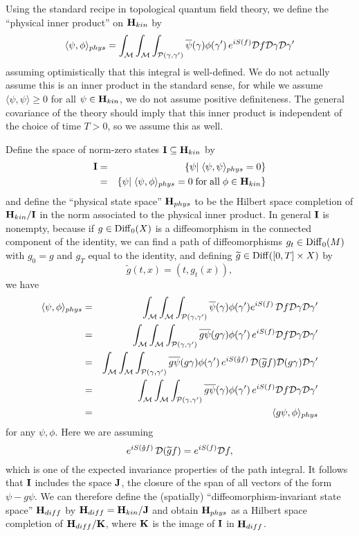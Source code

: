 \documentclass[12pt]{article}
\newcommand{\ban}{\begin{eqnarray*}}
\newcommand{\ean}{\end{eqnarray*}}
\newcommand{\M}{{\cal M}}
\renewcommand{\P}{{\cal P}}
\newcommand{\D}{{\cal D}}
\renewcommand{\H}{{\bf H}}
\newcommand{\I}{{\bf I}}
\newcommand{\J}{{\bf J}}
\newcommand{\K}{{\bf K}}
\newcommand{\Diff}{{\rm Diff}}
\begin{document}
Using the standard recipe in topological quantum field theory, we define
the ``physical inner product'' on $\H_{kin}$ by
\[ \langle \psi,\phi \rangle_{phys} = \int_{\M} \int_{\M}
 \int_{\P(\gamma,\gamma')}
\overline\psi(\gamma) \phi(\gamma') \, e^{iS(f)} \D f \D\gamma \D\gamma'\]
assuming optimistically that this integral is well-defined.
We do not actually assume this is an inner product in the standard
sense, for while we assume
$\langle \psi,\psi \rangle \ge 0$ for all $\psi \in \H_{kin}$, we do not
assume positive definiteness.
The general covariance of the theory should imply that this inner
product is independent of the choice of time $T > 0$, so we assume this
as well.

Define the space of norm-zero states $\I \subseteq \H_{kin}$ by
\ban        \I &=& \{ \psi | \; \langle\psi,\psi\rangle_{phys} = 0\} \\
&=&   \{ \psi | \;  \langle\psi,\phi \rangle_{phys}
= 0 \;{\rm for \; all }\; \phi \in \H_{kin} \}  \ean
and define the ``physical state space'' $\H_{phys}$ to be the Hilbert
space completion of $\H_{kin}/\I$ in the norm associated to the
physical inner product.
In general $\I$ is nonempty, because if $g \in \Diff_0(X)$ is a
diffeomorphism in the connected component of the identity,
we can find a path of diffeomorphisms
$g_t \in \Diff_0(M)$ with $g_0 = g$ and $g_T$ equal to the identity,
and defining
$\widetilde g \in \Diff([0,T] \times X)$ by
\[        \widetilde g(t,x) = (t,g_t(x)) ,\]
we have
\ban   \langle \psi,\phi\rangle_{phys} &=&
 \int_{\M} \int_{\M}
 \int_{\P(\gamma,\gamma')}
\overline\psi(\gamma) \phi(\gamma')e^{iS(f)}\, \D f  \D\gamma\D\gamma' \\
&=&   \int_{\M}  \int_{\M} \int_{\P(\gamma,\gamma')}
\overline{g\psi}(g\gamma) \phi(\gamma')\,  e^{iS(f)}  \D f\D\gamma\D\gamma' \\
&=&   \int_{\M}  \int_{\M}  \int_{\P(\gamma,\gamma')}
\overline{g\psi}(g\gamma) \phi(\gamma')\,  e^{iS(\tilde gf)}\, \D
(\widetilde gf)\D(g\gamma) \D\gamma' \\
&=&   \int_{\M} \int_{\M} \int_{\P(\gamma,\gamma')}
\overline{g\psi}(\gamma) \phi(\gamma')\, e^{iS(f)} \D f\D\gamma\D\gamma' \\
&=&    \langle g\psi,\phi\rangle_{phys}  \ean
for any $\psi,\phi$.   Here we are assuming
\[          e^{iS(\tilde gf)}\, \D(\widetilde gf) =  e^{iS(f)} \D f,\]
which is one of the expected invariance properties of the path
integral.
It follows that $\I$ includes the space $\J$, the closure of the
span of all vectors of
the form $\psi - g\psi$.  We can therefore define the (spatially)
``diffeomorphism-invariant state space'' $\H_{diff}$ by
$\H_{diff} = \H_{kin} /\J $
and obtain $\H_{phys}$ as a Hilbert space completion
of $\H_{diff}/\K$, where $\K$ is the image of $\I$ in $\H_{diff}$.
\end{document}
